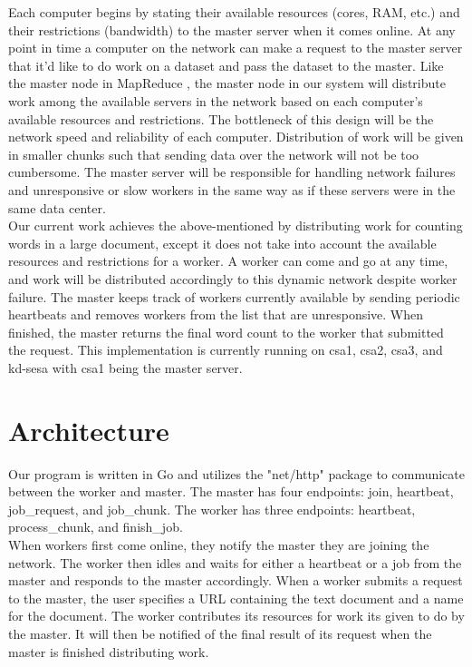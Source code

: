 \documentclass[twoside]{article}
\begin{document}
Each computer begins by stating their available resources (cores, RAM, etc.) and their restrictions (bandwidth) to the master server when it comes online. At any point in time a computer on the network can make a request to the master server that it'd like to do work on a dataset and pass the dataset to the master. Like the master node in MapReduce \cite{mapreduce}, the master node in our system will distribute work
among the available servers in the network based
on each computer's available resources and restrictions. The bottleneck of this design will be the network speed and reliability of each computer. Distribution of work will be given in smaller chunks such that sending data over the network will not be too cumbersome. The master server will be responsible for handling network failures and unresponsive or slow workers in the same way as if these servers were in the same data center. \\

Our current work achieves the above-mentioned by distributing work for counting words in a large document, except it does not take into account the available resources and restrictions for a worker. A worker can come and go at any time, and work will be distributed accordingly to this dynamic network despite worker failure. The master keeps track of workers currently available by sending periodic heartbeats and removes workers from the list that are unresponsive. When
finished, the master returns the final word count to the worker that submitted the request. This implementation is currently running on csa1, csa2, csa3, and kd-sesa with csa1 being the master server. 
\section{Architecture}
Our program is written in Go and utilizes the "net/http" package to communicate between the worker and master. The master has four endpoints: join, heartbeat, job\_request, and job\_chunk. The worker has three endpoints: heartbeat, process\_chunk, and finish\_job. \\

When workers first come online, they notify the master they are joining the network. The worker then idles and waits for either a heartbeat or a job from the master and responds to the master accordingly. When a worker submits a request to the master, the user specifies a URL containing the text document and a name for the document. The worker contributes its resources for work its given to do by the master. It will then be notified of the final result of its request when the master is finished
distributing work. \\
\end{document}

